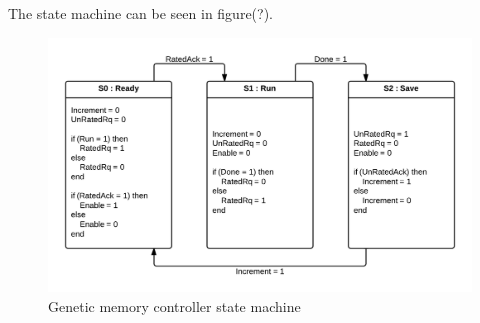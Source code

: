 The state machine can be seen in figure(?).\cn


\begin{figure}

  \centering
  \includegraphics[width=\textwidth]{fpga/fig/genetic_ctrl.png}
  \caption{Genetic memory controller state machine}
  \label{fpga:fig:mem:genetic_memory_ctrl}
\end{figure}
